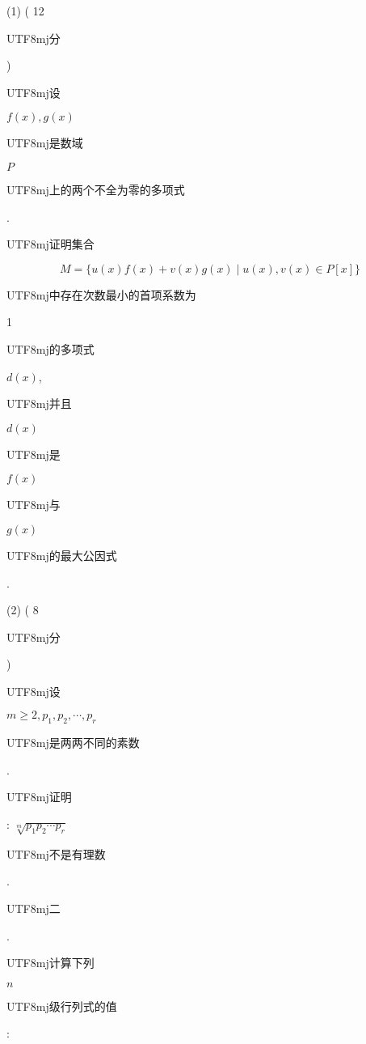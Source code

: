 \documentclass[10pt]{article}
\begin{document}
(1) ( 12 \begin{CJK}{UTF8}{mj}分\end{CJK}) \begin{CJK}{UTF8}{mj}设\end{CJK} $f(x), g(x)$ \begin{CJK}{UTF8}{mj}是数域\end{CJK} $P$ \begin{CJK}{UTF8}{mj}上的两个不全为零的多项式\end{CJK}. \begin{CJK}{UTF8}{mj}证明集合\end{CJK}
$$
M=\{u(x) f(x)+v(x) g(x) \mid u(x), v(x) \in P[x]\}
$$
\begin{CJK}{UTF8}{mj}中存在次数最小的首项系数为\end{CJK} 1 \begin{CJK}{UTF8}{mj}的多项式\end{CJK} $d(x)$, \begin{CJK}{UTF8}{mj}并且\end{CJK} $d(x)$ \begin{CJK}{UTF8}{mj}是\end{CJK} $f(x)$ \begin{CJK}{UTF8}{mj}与\end{CJK} $g(x)$ \begin{CJK}{UTF8}{mj}的最大公因式\end{CJK}.

(2) ( 8 \begin{CJK}{UTF8}{mj}分\end{CJK}) \begin{CJK}{UTF8}{mj}设\end{CJK} $m \geqslant 2, p_{1}, p_{2}, \cdots, p_{r}$ \begin{CJK}{UTF8}{mj}是两两不同的素数\end{CJK}. \begin{CJK}{UTF8}{mj}证明\end{CJK}: $\sqrt[m]{p_{1} p_{2} \cdots p_{r}}$ \begin{CJK}{UTF8}{mj}不是有理数\end{CJK}.

\begin{CJK}{UTF8}{mj}二\end{CJK}. \begin{CJK}{UTF8}{mj}计算下列\end{CJK} $n$ \begin{CJK}{UTF8}{mj}级行列式的值\end{CJK}:
\end{document}
